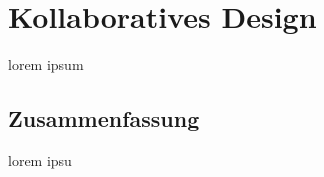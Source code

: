 \chapter{Kollaboratives Design}\label{ch:kollaborativesDesign}

lorem ipsum

\section*{Zusammenfassung}
lorem ipsu